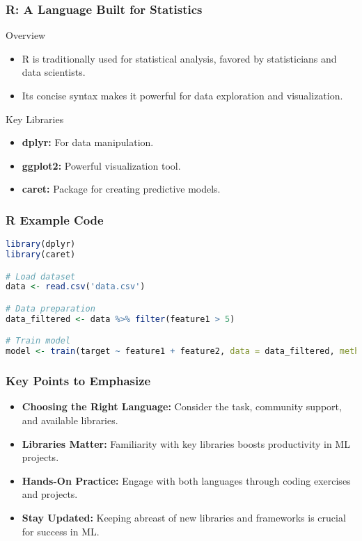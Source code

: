 \documentclass{beamer}
\begin{document}
\begin{frame}[fragile]
    \frametitle{R: A Language Built for Statistics}
    \begin{block}{Overview}
        \begin{itemize}
            \item R is traditionally used for statistical analysis, favored by statisticians and data scientists.
            \item Its concise syntax makes it powerful for data exploration and visualization.
        \end{itemize}
    \end{block}

    \begin{block}{Key Libraries}
        \begin{itemize}
            \item \textbf{dplyr:} For data manipulation.
            \item \textbf{ggplot2:} Powerful visualization tool.
            \item \textbf{caret:} Package for creating predictive models.
        \end{itemize}
    \end{block}
\end{frame}

\begin{frame}[fragile]
    \frametitle{R Example Code}
    \begin{lstlisting}[language=R]
library(dplyr)
library(caret)

# Load dataset
data <- read.csv('data.csv')

# Data preparation
data_filtered <- data %>% filter(feature1 > 5)

# Train model
model <- train(target ~ feature1 + feature2, data = data_filtered, method = 'lm')
    \end{lstlisting}
\end{frame}

\begin{frame}[fragile]
    \frametitle{Key Points to Emphasize}
    \begin{itemize}
        \item \textbf{Choosing the Right Language:} Consider the task, community support, and available libraries.
        \item \textbf{Libraries Matter:} Familiarity with key libraries boosts productivity in ML projects.
        \item \textbf{Hands-On Practice:} Engage with both languages through coding exercises and projects.
        \item \textbf{Stay Updated:} Keeping abreast of new libraries and frameworks is crucial for success in ML.
    \end{itemize}
\end{frame}
\end{document}
